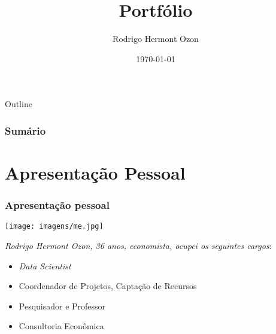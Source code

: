 \documentclass{beamer}
\title[Apresentação do Portfólio]{Portfólio} %
\author[Rodrigo Hermont Ozon]{
Rodrigo Hermont Ozon\\
} %
\institute[UFPR] %
{
Histórico de Entregas e Conquistas\\ %


\medskip

\textcolor{blue}{\url{https://www.linkedin.com/in/rodrigohermontozon}}

\vspace{.25cm}
\textcolor{blue}{\url{http://lattes.cnpq.br/3532649625879285}
}}
\date{\today} %
\begin{document}
\begin{frame}
\titlepage %
\end{frame}

\newcommand{\sumario}{
\begin{frame}[allowframebreaks]{Outline}
\frametitle{Sumário} %
\tableofcontents %
\end{frame}
}

\sumario

\section{Apresentação Pessoal}
\begin{frame}
\frametitle{Apresentação pessoal}

\centering
\texttt{[image: imagens/me.jpg]}

\footnotesize
\begin{flushleft}

   \textit{Rodrigo Hermont Ozon, 36 anos, economista, ocupei os seguintes cargos}: 
   
   \begin{itemize}
 
     \item<1-4> \textit{Data Scientist}

     \item<2-4> Coordenador de Projetos, Captação de Recursos
   
     \item<3-4> Pesquisador e Professor

   \item<4-4> Consultoria Econômica
   \end{itemize}

   
\end{flushleft}
    
\end{frame}
\end{document}
